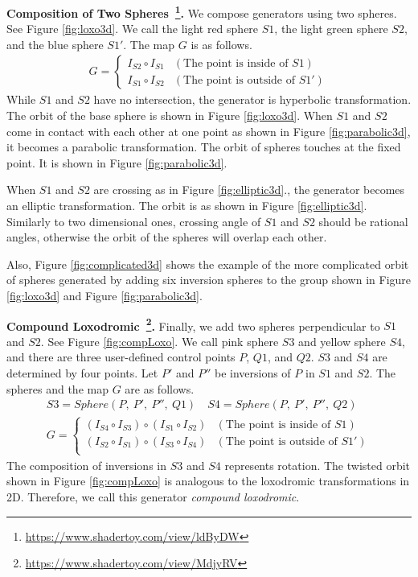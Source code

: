 \noindent\textbf{Composition of Two
Spheres~\footnote{\url{https://www.shadertoy.com/view/ldByDW}}.}
We compose generators using two spheres.
See Figure \ref{fig:loxo3d}.
We call the light red sphere $S1$, the light green sphere $S2$, and the blue
sphere $S1'$.
The map $G$ is as follows.
\begin{align*}
G =
\begin{cases}
 I_{S2} \circ I_{S1} & (\text{The point is inside of } S1) \\
 I_{S1} \circ I_{S2} & (\text{The point is outside of }S1')
\end{cases}
\end{align*}
While $S1$ and $S2$ have no intersection, the generator is hyperbolic
transformation.
The orbit of the base sphere is shown in Figure \ref{fig:loxo3d}.
When $S1$ and $S2$ come in contact with each other at one point as shown
in Figure \ref{fig:parabolic3d}, it becomes a
parabolic transformation.
The orbit of spheres touches at the fixed point.
It is shown in Figure \ref{fig:parabolic3d}.

When $S1$ and $S2$ are crossing as in Figure \ref{fig:elliptic3d}.,
the generator becomes an elliptic transformation.
The orbit is as shown in Figure \ref{fig:elliptic3d}.
Similarly to two dimensional ones, crossing angle of $S1$ and $S2$
should be rational angles,
otherwise the orbit of the spheres will overlap each other.

Also, Figure \ref{fig:complicated3d} shows the example of the more
complicated orbit of spheres generated by adding six inversion spheres to
the group shown in Figure \ref{fig:loxo3d} and Figure \ref{fig:parabolic3d}.

\noindent\textbf{Compound
Loxodromic~\footnote{\url{https://www.shadertoy.com/view/MdjyRV}}.}
Finally, we add two spheres perpendicular to $S1$ and $S2$.
See Figure \ref{fig:compLoxo}.
We call pink sphere $S3$ and yellow sphere $S4$, and there are three
user-defined control points $P$, $Q1$, and $Q2$.
$S3$ and $S4$ are determined by four points.
Let $P'$ and $P''$ be inversions of $P$ in $S1$ and $S2$.
The spheres and the map $G$ are as follows.
\begin{align*}
S3 = Sphere(P,~P',~P'',~Q1) \quad
S4 = Sphere(P,~P',~P'',~Q2) \\
G =
\begin{cases}
 (I_{S4} \circ I_{S3}) \circ (I_{S1} \circ I_{S2}) & (\text{The point is inside of } S1) \\
 (I_{S2} \circ I_{S1}) \circ (I_{S3} \circ I_{S4}) & (\text{The point is outside of }S1')\\
\end{cases}
\end{align*}
The composition of inversions in $S3$ and $S4$ represents rotation.
The twisted orbit shown in Figure
\ref{fig:compLoxo} is analogous to the loxodromic
transformations in 2D.
Therefore, we call this generator \textit{compound loxodromic}.


